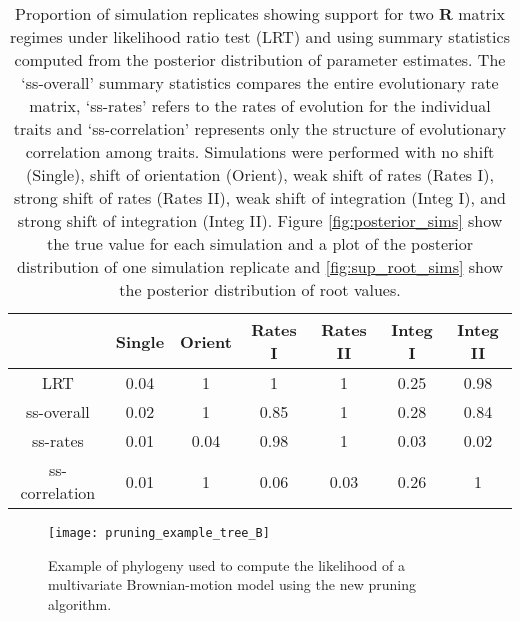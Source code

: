 \begin{table}[h]
\begin{small}
\caption[Proportion of simulation replicates showing support for two $\mathbf{R}$ matrix regimes under likelihood ratio test (LRT) and using summary statistics computed from the posterior distribution of parameter estimates.]{Proportion of simulation replicates showing support for two $\mathbf{R}$ matrix regimes under likelihood ratio test (LRT) and using summary statistics computed from the posterior distribution of parameter estimates. The `ss-overall' summary statistics compares the entire evolutionary rate matrix, `ss-rates' refers to the rates of evolution for the individual traits and `ss-correlation' represents only the structure of evolutionary correlation among traits. Simulations were performed with no shift (Single), shift of orientation (Orient), weak shift of rates (Rates I), strong shift of rates (Rates II), weak shift of integration (Integ I), and strong shift of integration (Integ II). Figure \ref{fig:posterior_sims} show the true value for each simulation and a plot of the posterior distribution of one simulation replicate and \ref{fig:sup_root_sims} show the posterior distribution of root values.}
\label{tab:model_test}
\end{small}
\begin{center}
\begin{tabular}{ccccccc}
\hline 
 & Single & Orient & Rates I & Rates II & Integ I & Integ II \\ 
\hline 
LRT & 0.04 & 1 & 1 & 1 & 0.25 & 0.98 \\ 
ss-overall & 0.02 & 1 & 0.85 & 1 & 0.28 & 0.84 \\
ss-rates & 0.01 & 0.04 & 0.98 & 1 & 0.03 & 0.02 \\
ss-correlation & 0.01 & 1 & 0.06 & 0.03 & 0.26 & 1 \\
\hline
\end{tabular}
\end{center}
\end{table}

\pagebreak

\begin{figure}[h]
	\centering
	\texttt{[image: pruning\_example\_tree\_B]}
	\caption[Example of phylogeny used to compute the likelihood of a multivariate Brownian-motion model using the new pruning algorithm.]{Example of phylogeny used to compute the likelihood of a multivariate Brownian-motion model using the new pruning algorithm.}
	\label{fig:example_phylo}
\end{figure}

